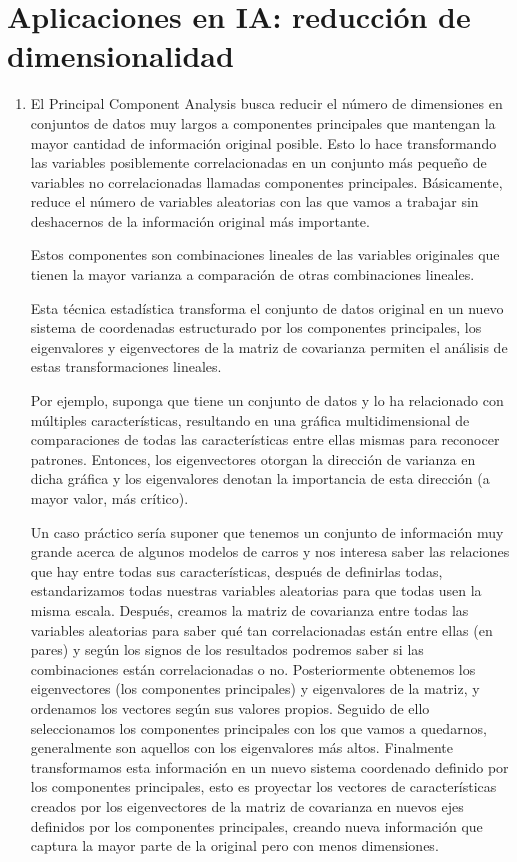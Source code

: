 \documentclass[12pt, letterpaper]{article}
\begin{document}
\section{Aplicaciones en IA: reducción de dimensionalidad}
\begin{enumerate}
    \item El Principal Component Analysis busca reducir el número de dimensiones en conjuntos de datos muy largos a componentes principales que mantengan la mayor cantidad de información original posible. Esto lo hace transformando las variables posiblemente correlacionadas en un conjunto más pequeño de variables no correlacionadas llamadas componentes principales. Básicamente, reduce el número de variables aleatorias con las que vamos a trabajar sin deshacernos de la información original más importante. \par
    Estos componentes son combinaciones lineales de las variables originales que tienen la mayor varianza a comparación de otras combinaciones lineales. \par
    Esta técnica estadística transforma el conjunto de datos original en un nuevo sistema de coordenadas estructurado por los componentes principales, los eigenvalores y eigenvectores de la matriz de covarianza permiten el análisis de estas transformaciones lineales. \par
    Por ejemplo, suponga que tiene un conjunto de datos y lo ha relacionado con múltiples características, resultando en una gráfica multidimensional de comparaciones de todas las características entre ellas mismas para reconocer patrones. Entonces, los eigenvectores otorgan la dirección de varianza en dicha gráfica y los eigenvalores denotan la importancia de esta dirección (a mayor valor, más crítico). \par
    Un caso práctico sería suponer que tenemos un conjunto de información muy grande acerca de algunos modelos de carros y nos interesa saber las relaciones que hay entre todas sus características, después de definirlas todas, estandarizamos todas nuestras variables aleatorias para que todas usen la misma escala. Después, creamos la matriz de covarianza entre todas las variables aleatorias para saber qué tan correlacionadas están entre ellas (en pares) y según los signos de los resultados podremos saber si las combinaciones están correlacionadas o no. Posteriormente obtenemos los eigenvectores (los componentes principales) y eigenvalores de la matriz, y ordenamos los vectores según sus valores propios. Seguido de ello seleccionamos los componentes principales con los que vamos a quedarnos, generalmente son aquellos con los eigenvalores más altos. Finalmente transformamos esta información en un nuevo sistema coordenado definido por los componentes principales, esto es proyectar los vectores de características creados por los eigenvectores de la matriz de covarianza en nuevos ejes definidos por los componentes principales, creando nueva información que captura la mayor parte de la original pero con menos dimensiones. 

\end{enumerate}
\end{document}
